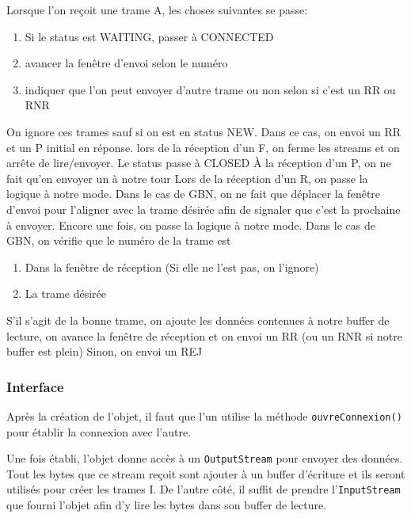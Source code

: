 \documentclass{article}
\newcounter{subsubsubsection}[subsubsection]
\begin{document}
    Lorsque l'on reçoit une trame A, les choses suivantes se passe:
    \begin{enumerate}
        \item Si le status est WAITING, passer à CONNECTED
        \item avancer la fenêtre d'envoi selon le numéro
        \item indiquer que l'on peut envoyer d'autre trame ou non selon si c'est un RR ou RNR
    \end{enumerate}
        On ignore ces trames sauf si on est en status NEW. Dans ce cas, on envoi un RR et un P initial en réponse.
        lors de la réception d'un F, on ferme les streams et on arrête de lire/envoyer. Le status passe à CLOSED
        À la réception d'un P, on ne fait qu'en envoyer un à notre tour
        Lors de la réception d'un R, on passe la logique à notre mode. Dans le cas de GBN, on ne fait que déplacer la fenêtre d'envoi pour l'aligner avec la trame désirée afin de signaler que c'est la prochaine à envoyer.
        Encore une fois, on passe la logique à notre mode. Dans le cas de GBN, on vérifie que le numéro de la trame est 
        \begin{enumerate}
            \item Dans la fenêtre de réception (Si elle ne l'est pas, on l'ignore)
            \item La trame désirée
        \end{enumerate}
        S'il s'agit de la bonne trame, on ajoute les données contenues à notre buffer de lecture, on avance la fenêtre de réception et on envoi un RR (ou un RNR si notre buffer est plein)
        Sinon, on envoi un REJ

    \subsubsection{Interface}
    Après la création de l'objet, il faut que l'un utilise la méthode \verb#ouvreConnexion()# pour établir la connexion avec l'autre. 
    
    Une fois établi, l'objet donne accès à un \verb#OutputStream# pour envoyer des données. Tout les bytes que ce stream reçoit sont ajouter à un buffer d'écriture et ils seront utilisés pour créer les trames I.
    De l'autre côté, il suffit de prendre l'\verb#InputStream# que fourni l'objet afin d'y lire les bytes dans son buffer de lecture.
    
\end{document}
